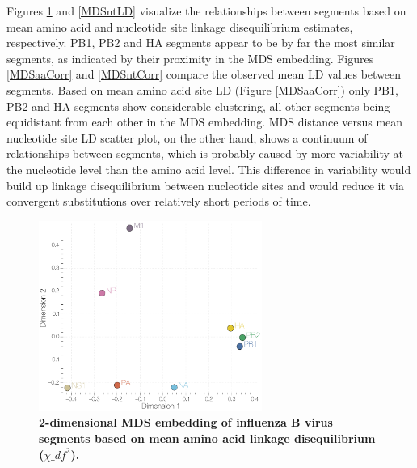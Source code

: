\documentclass[11pt,oneside,letterpaper]{article}
\begin{document}
\clearpage

Figures \ref{MDSaaLD} and \ref{MDSntLD} visualize the relationships between segments based on mean amino acid and nucleotide site linkage disequilibrium estimates, respectively.
PB1, PB2 and HA segments appear to be by far the most similar segments, as indicated by their proximity in the MDS embedding.
Figures \ref{MDSaaCorr} and \ref{MDSntCorr} compare the observed mean LD values between segments. 
Based on mean amino acid site LD (Figure \ref{MDSaaCorr}) only PB1, PB2 and HA segments show considerable clustering, all other segments being equidistant from each other in the MDS embedding.
MDS distance versus mean nucleotide site LD scatter plot, on the other hand, shows a continuum of relationships between segments, which is probably caused by more variability at the nucleotide level than the amino acid level.
This difference in variability would build up linkage disequilibrium between nucleotide sites and would reduce it via convergent substitutions over relatively short periods of time.

\begin{figure}
\centering  
\includegraphics[width=0.65\textwidth]  {supp_figures/InfB_8x8_aaLD_MDS.png}
\caption{\textbf{2-dimensional MDS embedding of influenza B virus segments based on mean amino acid linkage disequilibrium ($\chi\_{df}^{2}$).}}
\label{MDSaaLD}
\end{figure}
\end{document}
